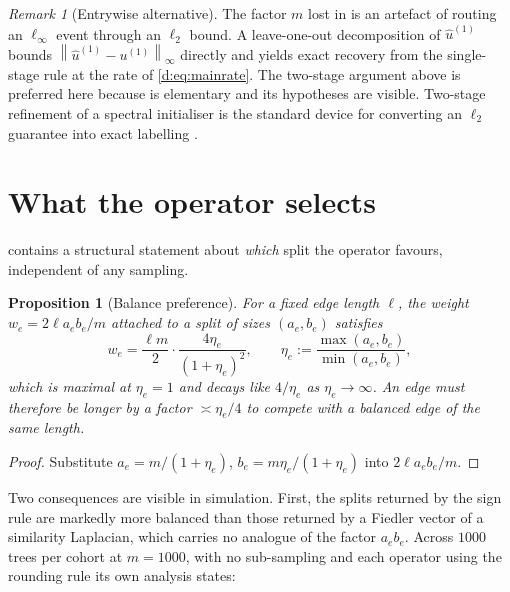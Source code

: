 \documentclass[11pt]{article}
\theoremstyle{plain}
\newtheorem{proposition}{Proposition}
\theoremstyle{definition}
\theoremstyle{remark}
\newtheorem{remark}{Remark}
\providecommand{\uone}{u^{(1)}}
\providecommand{\huone}{\hat u^{(1)}}
\providecommand{\1}{\mathbf{1}}
\providecommand{\norm}[1]{\left\lVert #1 \right\rVert}
\begin{document}
\begin{remark}[Entrywise alternative]\label{d:rem:entrywise}
The factor $m$ lost in  is an artefact of routing an
$\ell_\infty$ event through an $\ell_2$ bound. A leave-one-out decomposition of
$\huone$ bounds $\norm{\huone-\uone}_\infty$ directly
\cite{abbe2020entrywise,chen2021spectral} and yields exact recovery from the
single-stage rule at the rate of \eqref{d:eq:mainrate}. The two-stage argument
above is preferred here because  is elementary and its
hypotheses are visible. Two-stage refinement of a spectral initialiser is the
standard device for converting an $\ell_2$ guarantee into exact labelling
\cite{gao2017achieving,loffler2021optimality}.
\end{remark}

\section{What the operator selects}\label{d:sec:empirical}

 contains a structural statement about \emph{which} split
the operator favours, independent of any sampling.

\begin{proposition}[Balance preference]\label{d:prop:balance}
For a fixed edge length $\ell$, the weight $w_e=2\ell a_eb_e/m$ attached to a
split of sizes $(a_e,b_e)$ satisfies
\begin{equation}\label{d:eq:balance}
  w_e=\frac{\ell m}{2}\cdot\frac{4\eta_e}{(1+\eta_e)^2},
  \qquad \eta_e:=\frac{\max(a_e,b_e)}{\min(a_e,b_e)},
\end{equation}
which is maximal at $\eta_e=1$ and decays like $4/\eta_e$ as
$\eta_e\to\infty$. An edge must therefore be longer by a factor
$\asymp\eta_e/4$ to compete with a balanced edge of the same length.
\end{proposition}

\begin{proof}
Substitute $a_e=m/(1+\eta_e)$, $b_e=m\eta_e/(1+\eta_e)$ into $2\ell a_eb_e/m$.
\end{proof}

Two consequences are visible in simulation. First, the splits returned by the
sign rule are markedly more balanced than those returned by a Fiedler vector of
a similarity Laplacian, which carries no analogue of the factor $a_eb_e$.
Across $1000$ trees per cohort at $m=1000$, with no sub-sampling and each
operator using the rounding rule its own analysis states:
\end{document}
